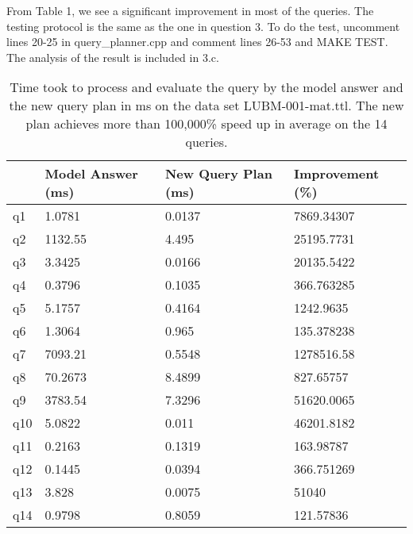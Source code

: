 \documentclass{article}
\begin{document}
\begin{enumerate}
\begin{enumerate}
\begin{algorithm}[H]
\begin{algorithmic}
\EndFor
\EndWhile

\end{algorithmic}
\end{algorithm}


From Table 1, we see a significant improvement in most of the queries. The testing protocol is the same as the one in question 3. To do the test, uncomment lines 20-25 in query\_planner.cpp and comment lines 26-53 and MAKE TEST. The analysis of the result is included in 3.c.

\begin{table}[]\centering
\begin{tabular}{|l|l|l|l|}
\hline
    & Model Answer (ms) & New Query Plan (ms) & Improvement (\%) \\ \hline
q1  & 1.0781            & 0.0137              & 7869.34307       \\ \hline
q2  & 1132.55           & 4.495               & 25195.7731       \\ \hline
q3  & 3.3425            & 0.0166              & 20135.5422       \\ \hline
q4  & 0.3796            & 0.1035              & 366.763285       \\ \hline
q5  & 5.1757            & 0.4164              & 1242.9635        \\ \hline
q6  & 1.3064            & 0.965               & 135.378238       \\ \hline
q7  & 7093.21           & 0.5548              & 1278516.58       \\ \hline
q8  & 70.2673           & 8.4899              & 827.65757        \\ \hline
q9  & 3783.54           & 7.3296              & 51620.0065       \\ \hline
q10 & 5.0822            & 0.011               & 46201.8182       \\ \hline
q11 & 0.2163            & 0.1319              & 163.98787        \\ \hline
q12 & 0.1445            & 0.0394              & 366.751269       \\ \hline
q13 & 3.828             & 0.0075              & 51040       \\ \hline
q14 & 0.9798            & 0.8059              & 121.57836        \\ \hline
\end{tabular}
\caption{Time took to process and evaluate the query by the model answer and the new query plan in ms on the data set LUBM-001-mat.ttl. The new plan achieves more than 100,000\% speed up in average on the 14 queries.}
\end{table}


\end{enumerate}
\end{enumerate}
\end{document}
